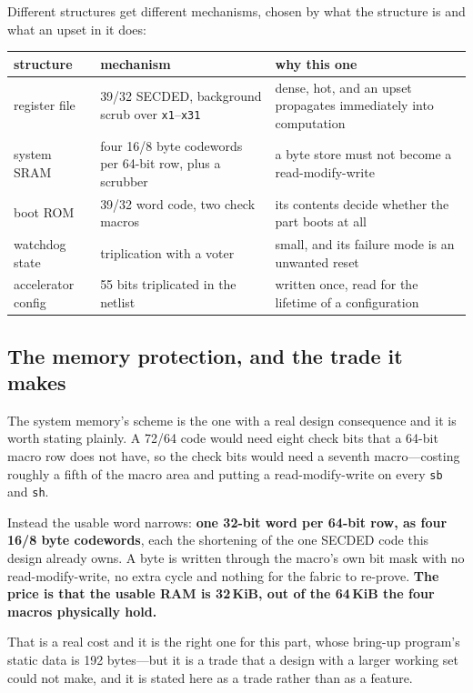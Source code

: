 \documentclass[11pt,a4paper]{article}
\begin{document}
Different structures get different mechanisms, chosen by what the
structure is and what an upset in it does:

\begin{center}
\begin{tabular}{L{3.4cm}L{4.3cm}L{5.2cm}}
\toprule
structure & mechanism & why this one \\
\midrule
register file & \num{39}/\num{32} SECDED, background scrub over
  \texttt{x1}--\texttt{x31} & dense, hot, and an upset propagates
  immediately into computation \\
system SRAM & four \num{16}/\num{8} byte codewords per \num{64}-bit row,
  plus a scrubber & a byte store must not become a read-modify-write \\
boot ROM & \num{39}/\num{32} word code, two check macros & its contents
  decide whether the part boots at all \\
watchdog state & triplication with a voter & small, and its failure mode
  is an unwanted reset \\
accelerator config & \num{55} bits triplicated in the netlist & written
  once, read for the lifetime of a configuration \\
\bottomrule
\end{tabular}
\end{center}

\subsection{The memory protection, and the trade it makes}

The system memory's scheme is the one with a real design consequence and
it is worth stating plainly. A \num{72}/\num{64} code would need eight
check bits that a \num{64}-bit macro row does not have, so the check bits
would need a seventh macro---costing roughly a fifth of the macro area
and putting a read-modify-write on every \texttt{sb} and \texttt{sh}.

Instead the usable word narrows: \textbf{one \num{32}-bit word per
\num{64}-bit row, as four \num{16}/\num{8} byte codewords}, each the
shortening of the one SECDED code this design already owns. A byte is
written through the macro's own bit mask with no read-modify-write, no
extra cycle and nothing for the fabric to re-prove. \textbf{The price is
that the usable RAM is \num{32}\,KiB, out of the \num{64}\,KiB the four
macros physically hold.}

That is a real cost and it is the right one for this part, whose
bring-up program's static data is \num{192} bytes---but it is a trade
that a design with a larger working set could not make, and it is stated
here as a trade rather than as a feature.
\end{document}
